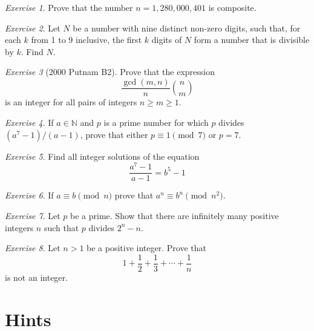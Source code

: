 \documentclass{article}
\theoremstyle{definition}
\theoremstyle{remark}
\newtheorem{exercise}{Exercise}
\newcommand{\NN}{\mathbb{N}}
\begin{document}
    \begin{exercise}
        Prove that the number \(n=1,280,000,401\) is composite.
    \end{exercise}

    \begin{exercise}
        Let \(N\) be a number with nine distinct non-zero digits, such that, for each \(k\) from 1 to 9 inclusive, the first \(k\) digits of \(N\) form a number that is divisible by \(k\). 
        Find \(N\).
    \end{exercise}

    \begin{exercise}[2000 Putnam B2]
        Prove that the expression
        \[\frac{\gcd(m,n)}{n}\binom{n}{m}\]
        is an integer for all pairs of integers \(n\geq m\geq 1\).
    \end{exercise}
    
    \begin{exercise}
        If $a\in \NN$ and $p$ is a prime number for which $p$ divides $(a^7-1)/(a-1)$, prove that either $p \equiv 1 \pmod{7}$ or $p=7$.
    \end{exercise}
    
    \begin{exercise}
        Find all integer solutions of the equation
        \[\frac{a^7-1}{a-1} = b^5-1\]
    \end{exercise}
    
    \begin{exercise}
        If $a\equiv b \pmod{n}$ prove that $a^n \equiv b^n \pmod{n^2}$.
    \end{exercise}
    
    \begin{exercise}
        Let $p$ be a prime. Show that there are infinitely many positive integers $n$ such that $p$ divides $2^n-n$.
    \end{exercise}
    
    \begin{exercise}
        Let $n>1$ be a positive integer. Prove that 
        \[1+\frac{1}{2}+\frac{1}{3}+\cdots + \frac{1}{n}\] is not an integer.
    \end{exercise}

\newpage
\section{Hints}
\end{document}
